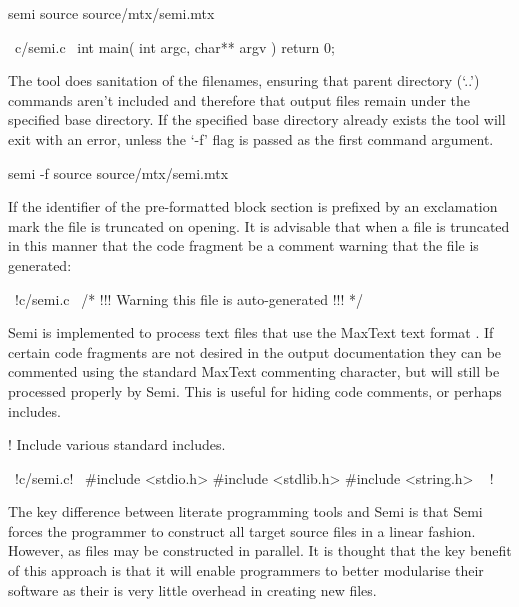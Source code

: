 \documentclass[]{article}
\begin{document}
\begin{verbatimtab}
	semi source source/mtx/semi.mtx

\end{verbatimtab}
\begin{verbatimtab}
	~c/semi.c~
	int main( int argc, char** argv )
	{
		return 0;
	}
	~

\end{verbatimtab}

The tool does sanitation of the filenames, ensuring that parent directory (`..') commands aren't included and therefore that output files remain under the specified base directory.
If the specified base directory already exists the tool will exit with an error, unless the `-f' flag is passed as the first command argument.

\begin{verbatimtab}
	semi -f source source/mtx/semi.mtx

\end{verbatimtab}

If the identifier of the pre-formatted block section is prefixed by an exclamation mark the file is truncated on opening.
It is advisable that when a file is truncated in this manner that the code fragment be a comment warning that the file is generated:

\begin{verbatimtab}
	~!c/semi.c~
	/*   !!!   Warning this file is auto-generated   !!!   */
	~

\end{verbatimtab}

Semi is implemented to process text files that use the MaxText text format \cite{MaxText}.
If certain code fragments are not desired in the output documentation they can be commented using the standard MaxText commenting character, but will still be processed properly by Semi.
This is useful for hiding code comments, or perhaps includes.

\begin{verbatimtab}
	!
	Include various standard includes.

	~!c/semi.c!~
	#include <stdio.h>
	#include <stdlib.h>
	#include <string.h>
	~
	!

\end{verbatimtab}

The key difference between literate programming tools and Semi is that Semi forces the programmer to construct all target source files in a linear fashion.
However, as files may be constructed in parallel.
It is thought that the key benefit of this approach is that it will enable programmers to better modularise their software as their is very little overhead in creating new files.
\end{document}

